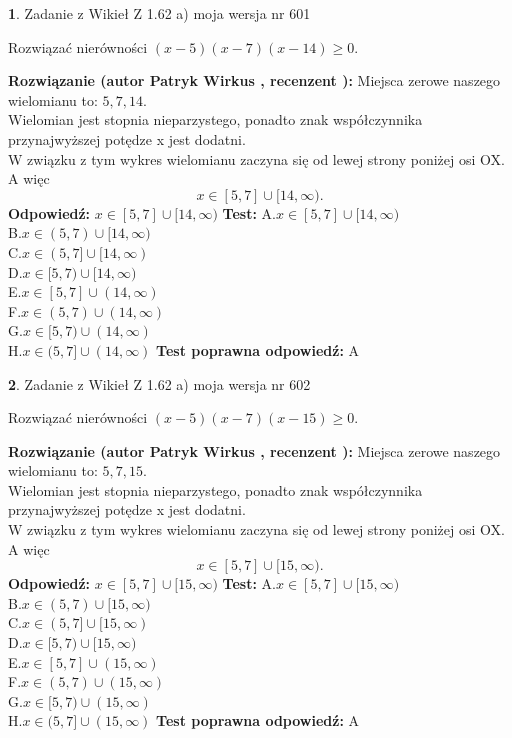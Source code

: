 \documentclass[12pt, a4paper]{article}
\theoremstyle{definition} %
\newtheorem{zad}{}
\newcommand{\zadStart}[1]{\begin{zad}#1\newline}
\newcommand{\zadStop}{\end{zad}}
\newcommand{\rozwStart}[2]{\noindent \textbf{Rozwiązanie (autor #1 , recenzent #2): }\newline}
\newcommand{\rozwStop}{\newline}
\newcommand{\odpStart}{\noindent \textbf{Odpowiedź:}\newline}
\newcommand{\odpStop}{\newline}
\newcommand{\testStart}{\noindent \textbf{Test:}\newline}
\newcommand{\testStop}{\newline}
\newcommand{\kluczStart}{\noindent \textbf{Test poprawna odpowiedź:}\newline}
\newcommand{\kluczStop}{\newline}
\begin{document}
\zadStart{Zadanie z Wikieł Z 1.62 a) moja wersja nr 601}

Rozwiązać nierówności $(x-5)(x-7)(x-14)\ge0$.
\zadStop
\rozwStart{Patryk Wirkus}{}
Miejsca zerowe naszego wielomianu to: $5, 7, 14$.\\
Wielomian jest stopnia nieparzystego, ponadto znak współczynnika przy\linebreak najwyższej potędze x jest dodatni.\\ W związku z tym wykres wielomianu zaczyna się od lewej strony poniżej osi OX. A więc $$x \in [5,7] \cup [14,\infty).$$
\rozwStop
\odpStart
$x \in [5,7] \cup [14,\infty)$
\odpStop
\testStart
A.$x \in [5,7] \cup [14,\infty)$\\
B.$x \in (5,7) \cup [14,\infty)$\\
C.$x \in (5,7] \cup [14,\infty)$\\
D.$x \in [5,7) \cup [14,\infty)$\\
E.$x \in [5,7] \cup (14,\infty)$\\
F.$x \in (5,7) \cup (14,\infty)$\\
G.$x \in [5,7) \cup (14,\infty)$\\
H.$x \in (5,7] \cup (14,\infty)$
\testStop
\kluczStart
A
\kluczStop



\zadStart{Zadanie z Wikieł Z 1.62 a) moja wersja nr 602}

Rozwiązać nierówności $(x-5)(x-7)(x-15)\ge0$.
\zadStop
\rozwStart{Patryk Wirkus}{}
Miejsca zerowe naszego wielomianu to: $5, 7, 15$.\\
Wielomian jest stopnia nieparzystego, ponadto znak współczynnika przy\linebreak najwyższej potędze x jest dodatni.\\ W związku z tym wykres wielomianu zaczyna się od lewej strony poniżej osi OX. A więc $$x \in [5,7] \cup [15,\infty).$$
\rozwStop
\odpStart
$x \in [5,7] \cup [15,\infty)$
\odpStop
\testStart
A.$x \in [5,7] \cup [15,\infty)$\\
B.$x \in (5,7) \cup [15,\infty)$\\
C.$x \in (5,7] \cup [15,\infty)$\\
D.$x \in [5,7) \cup [15,\infty)$\\
E.$x \in [5,7] \cup (15,\infty)$\\
F.$x \in (5,7) \cup (15,\infty)$\\
G.$x \in [5,7) \cup (15,\infty)$\\
H.$x \in (5,7] \cup (15,\infty)$
\testStop
\kluczStart
A
\kluczStop
\end{document}
